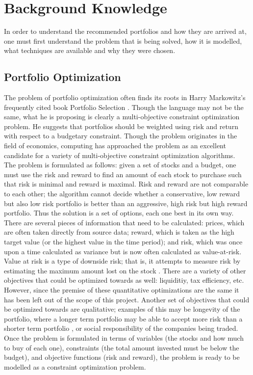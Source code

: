 \documentclass{article}
\begin{document}
    \section{Background Knowledge}
    In order to understand the recommended portfolios and how they are arrived at, one must first understand the problem that is being solved, how it is 
    modelled, what techniques are available and why they were chosen. 
    \subsection{Portfolio Optimization}
    The problem of portfolio optimization often finds its roots in Harry Markowitz's frequently cited book Portfolio Selection \cite{Markowitz}. Though
    the language may not be the same, what he is proposing is clearly a multi-objective constraint optimization problem. He suggests that portfolios
    should be weighted using risk and return with respect to a budgetary constraint. Though the problem originates in the field of 
    economics, computing has approached the problem as an excellent candidate for a variety of multi-objective constraint optimization algorithms. \\
    The problem is formulated as follows: given a set of stocks and a budget, one must use the risk and reward to find an amount of each stock to
    purchase such that risk is minimal and reward is maximal. Risk and reward are not comparable to each other; the algorithm cannot decide whether
    a conservative, low reward but also low risk portfolio is better than an aggressive, high risk but high reward portfolio. Thus the solution is a 
    set of options, each one best in its own way. There are several pieces of information that need to be calculated: prices, which are often taken 
    directly from source data; reward, which is taken as the high target value (or the highest value in the time period); and risk, which was once 
    upon a time calculated as variance
    but is now often calculated as value-at-risk. Value at risk is a type of downside risk; that is, it attempts to measure risk by estimating the
    maximum amount lost on the stock \cite{HongHuZhang} \cite{Cid}. There are a variety of other objectives that could be optimized towards as well: 
    liquiditiy, tax efficiency, etc. However, since the premise of these quantitative optimizations are the same it has been left out of the scope 
    of this project. Another set of objectives that could be optimized towards are qualitative; examples of this may be longevity of the portfolio,
    where a longer term portfolio may be able to accept more risk than a shorter term portfolio \cite{Xiongetal}, or social responsibility of the 
    companies being traded. Once the problem is formulated in terms of variables (the stocks and how much to buy of each one), constraints (the 
    total amount invested must be below the budget), and objective functions (risk and reward), the problem is ready to be modelled as a constraint
    optimization problem.
\end{document}
